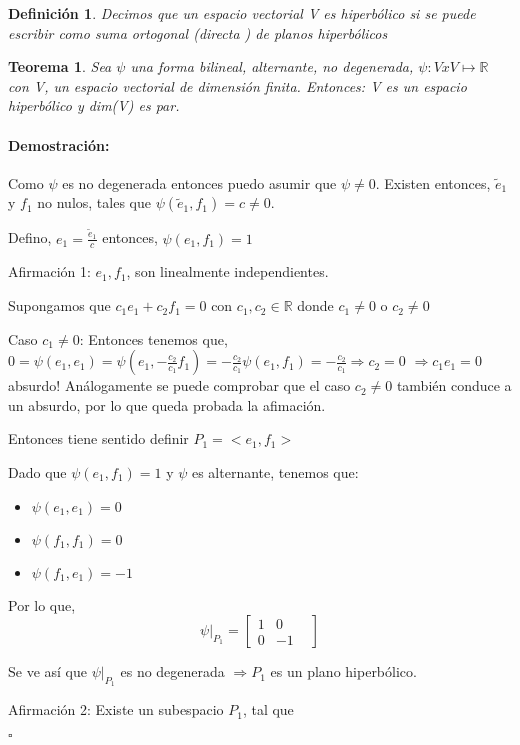 \documentclass[12pt]{article}
\newtheorem{theorem}{Teorema}
\newtheorem{definition}{Definición}
\newenvironment{proof}{\paragraph{Demostración:}}{\hfill$\square$}
\begin{document}
\begin{definition}   
 Decimos que un espacio vectorial V es hiperbólico si se puede escribir como suma ortogonal (directa ) de
 planos hiperbólicos
\end{definition}

\begin{theorem} \label{Lang-8.1}
 Sea $\psi$ una forma bilineal, alternante, no degenerada, $\psi:VxV\mapsto \mathbb{R}$ con V, un espacio 
 vectorial de dimensión finita.
 Entonces: V es un espacio hiperbólico y dim(V) es par.
\end{theorem}

\begin{proof}
Como $\psi$ es no degenerada entonces puedo asumir que $\psi \neq 0$.
Existen entonces, $\tilde{e}_1$ y $f_1$ no nulos, tales que $\psi(\tilde{e}_1,f_1)=c\neq0$.

Defino, $e_1=\frac{\tilde{e}_1}{c}$ entonces, $\psi(e_1,f_1)=1$

Afirmación 1: $e_1,f_1$, son linealmente independientes.

Supongamos que  $c_1 e_1 +c_2 f_1 = 0$ con $c_1,c_2 \in \mathbb{R}$  donde $c_1\neq0$ o  $c_2\neq0$

Caso $c_1\neq0$:
Entonces tenemos que,
$0=\psi(e_1,e_1)=\psi(e_1,- \frac{c_2}{c_1} f_1)= - \frac{c_2}{c_1} \psi(e_1,f_1)=- \frac{c_2}{c_1} \Rightarrow c_2=0$
$\Rightarrow c_1 e_1 = 0$ absurdo!
Análogamente se puede comprobar que el caso $c_2\neq0$ también conduce a un absurdo, por lo que queda probada la
afimación.

Entonces tiene sentido definir $P_1=<e_1,f_1>$
    
Dado que $\psi(e_1,f_1)=1$ y $\psi$ es alternante, tenemos que:
\begin{itemize}
 \item $\psi(e_1,e_1)=0$
 \item $\psi(f_1,f_1)=0$
 \item $\psi(f_1,e_1)=-1$
\end{itemize}

Por lo que, 
$$\psi|_{P_1} = 
\begin{bmatrix}
 1 & 0 &\\ 
 0& -1&
\end{bmatrix}
$$

Se ve así que $\psi|_{P_1}$ es no degenerada $\Rightarrow P_1$ es un plano hiperbólico.
\newline

Afirmación 2: Existe un subespacio $P_1$, tal que 
 

\end{proof}
\end{document}

